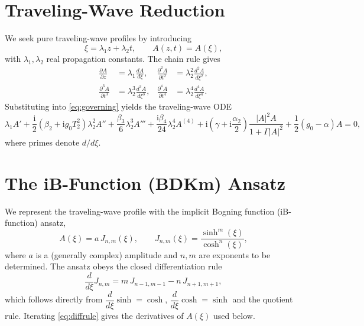 \documentclass[11pt]{article}
\newcommand{\ii}{\mathrm{i}}
\begin{document}
\section{Traveling-Wave Reduction}

We seek pure traveling-wave profiles by introducing
\begin{equation}
\xi=\lambda_1 z+\lambda_2 t, \qquad A(z,t)=A(\xi),
\label{eq:tw}
\end{equation}
with $\lambda_1,\lambda_2$ real propagation constants. The chain rule gives
\begin{align}
\frac{\partial A}{\partial z}&=\lambda_1\frac{dA}{d\xi}, &
\frac{\partial^2 A}{\partial t^2}&=\lambda_2^2\frac{d^2A}{d\xi^2}, \\
\frac{\partial^3 A}{\partial t^3}&=\lambda_2^3\frac{d^3A}{d\xi^3}, &
\frac{\partial^4 A}{\partial t^4}&=\lambda_2^4\frac{d^4A}{d\xi^4}.
\end{align}
Substituting into \eqref{eq:governing} yields the traveling-wave ODE
\begin{equation}
\lambda_1 A'
+\frac{\ii}{2}\!\left(\beta_2+\ii g_0T_2^2\right)\lambda_2^2 A''
+\frac{\beta_3}{6}\lambda_2^3A'''
+\frac{\ii\beta_4}{24}\lambda_2^4A^{(4)}
+\ii\!\left(\gamma+\ii\frac{\alpha_2}{2}\right)\frac{|A|^2A}{1+\Gamma|A|^2}
+\frac{1}{2}(g_0-\alpha)A=0,
\label{eq:tw-ode}
\end{equation}
where primes denote $d/d\xi$.

\section{The iB-Function (BDKm) Ansatz}

We represent the traveling-wave profile with the implicit Bogning function (iB-function)
ansatz,
\begin{equation}
A(\xi)=a\,J_{n,m}(\xi), \qquad
J_{n,m}(\xi)=\frac{\sinh^m(\xi)}{\cosh^n(\xi)},
\label{eq:ansatz}
\end{equation}
where $a$ is a (generally complex) amplitude and $n,m$ are exponents to be determined.
The ansatz obeys the closed differentiation rule
\begin{equation}
\frac{d}{d\xi}J_{n,m}=m\,J_{n-1,m-1}-n\,J_{n+1,m+1},
\label{eq:diffrule}
\end{equation}
which follows directly from $\dfrac{d}{d\xi}\sinh=\cosh$, $\dfrac{d}{d\xi}\cosh=\sinh$
and the quotient rule. Iterating \eqref{eq:diffrule} gives the derivatives of $A(\xi)$
used below.
\end{document}
